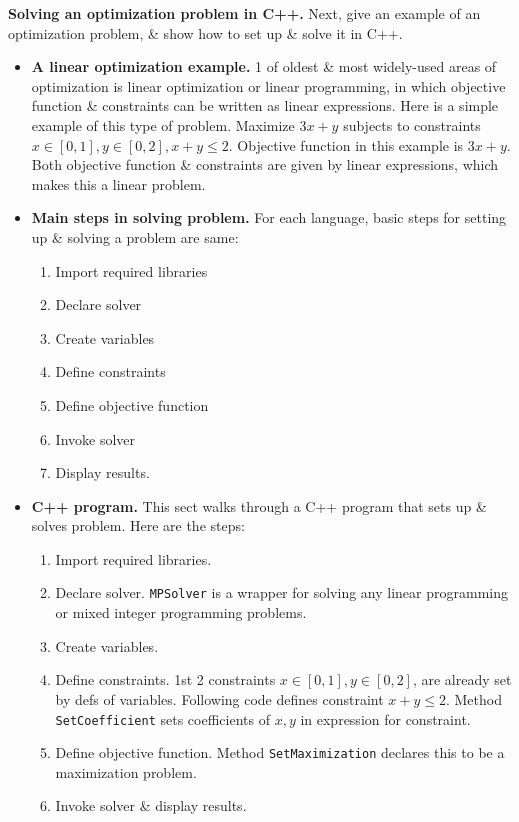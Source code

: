\documentclass{article}
\begin{document}
{\bf Solving an optimization problem in C++.} Next, give an example of an optimization problem, \& show how to set up \& solve it in C++.
\begin{itemize}
    \item {\bf A linear optimization example.} 1 of oldest \& most widely-used areas of optimization is linear optimization or linear programming, in which objective function \& constraints can be written as linear expressions. Here is a simple example of this type of problem. Maximize $3x + y$ subjects to constraints $x\in[0,1],y\in[0,2],x + y\le2$. Objective function in this example is $3x + y$. Both objective function \& constraints are given by linear expressions, which makes this a linear problem.
    \item {\bf Main steps in solving problem.} For each language, basic steps for setting up \& solving a problem are same:
    \begin{enumerate}
        \item Import required libraries
        \item Declare solver
        \item Create variables
        \item Define constraints
        \item Define objective function
        \item Invoke solver
        \item Display results.
    \end{enumerate}
    \item {\bf C++ program.} This sect walks through a C++ program that sets up \& solves problem. Here are the steps:
    \begin{enumerate}
        \item Import required libraries.
        \item Declare solver. {\tt MPSolver} is a wrapper for solving any linear programming or mixed integer programming problems.
        \item Create variables.
        \item Define constraints. 1st 2 constraints $x\in[0,1],y\in[0,2]$, are already set by defs of variables. Following code defines constraint $x + y\le2$. Method {\tt SetCoefficient} sets coefficients of $x,y$ in expression for constraint.
        \item Define objective function. Method {\tt SetMaximization} declares this to be a maximization problem.
        \item Invoke solver \& display results.
    \end{enumerate}
\end{itemize}
\end{document}
